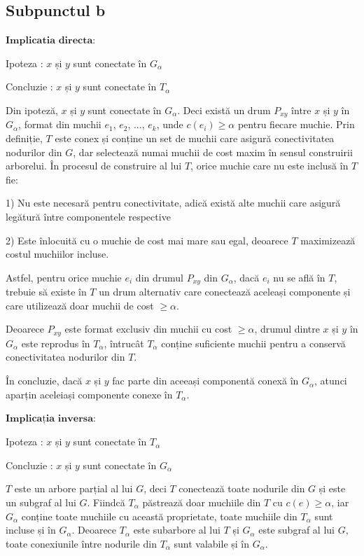 \documentclass{article}
\begin{document}
{{\subsection*{\fontsize{16}{30}\selectfont Subpunctul b}
{\fontsize{14}{16}\selectfont 
$\mathbf{Implicatia}$ $\mathbf{directa:}$ 
\\
\par Ipoteza : $x$ și $y$ sunt conectate în $G_\alpha$
\par Concluzie : $x$ și $y$ sunt conectate în $T_\alpha$         
\\
\par Din ipoteză, $x$ și $y$ sunt conectate în $G_\alpha$. Deci există un drum $P_{xy}$ între $x$ și $y$ în $G_\alpha$, format din muchii $e_1$, $e_2$, ..., $e_k$, unde $c(e_i) \geq \alpha$ pentru fiecare muchie.
Prin definiție, $T$ este conex și conține un set de muchii care asigură conectivitatea nodurilor din $G$, dar selectează numai muchii de cost maxim în sensul construirii arborelui. În procesul de construire al lui $T$, orice muchie care nu este inclusă în $T$ fie:
\par 1) Nu este necesară pentru conectivitate, adică există alte muchii care asigură legătură între componentele respective
\par 2) Este înlocuită cu o muchie de cost mai mare sau egal, deoarece $T$ maximizează costul muchiilor incluse. 
\par Astfel, pentru orice muchie $e_i$ din drumul $P_{xy}$ din $G_\alpha$, dacă $e_i$ nu se află în $T$, trebuie să existe în $T$ un drum alternativ care conectează aceleași componente și care utilizează doar muchii de cost $\geq \alpha$.
\par Deoarece $P_{xy}$ este format exclusiv din muchii cu cost $\geq \alpha$, drumul dintre $x$ și $y$ în $G_\alpha$ este reprodus în $T_\alpha$, întrucât $T_\alpha$ conține suficiente muchii pentru a conservă conectivitatea nodurilor din $T$. 
\par În concluzie, dacă $x$ și $y$ fac parte din aceeași componentă conexă în $G_\alpha$, atunci aparțin aceleiași componente conexe în $T_\alpha$.    
\\
\par $\mathbf{Implicația}$ $\mathbf{inversa:}$
\\
\par Ipoteza : $x$ și $y$ sunt conectate în $T_\alpha$
\par Concluzie : $x$ și $y$ sunt conectate în $G_\alpha$
\\
\par $T$ este un arbore parțial al lui $G$, deci $T$ conectează toate nodurile din $G$ și este un subgraf al lui $G$. Fiindcă $T_\alpha$ păstrează doar muchiile din $T$ cu $c(e)\geq \alpha$, iar $G_\alpha$ conține toate muchiile cu această proprietate, toate muchiile din $T_\alpha$ sunt incluse și în $G_\alpha$. Deoarece $T_\alpha$ este subarbore al lui $T$ și $G_\alpha$ este subgraf al lui $G$, toate conexiunile între nodurile din $T_\alpha$ sunt valabile și în $G_\alpha$.
\\
}    

}}
\end{document}

